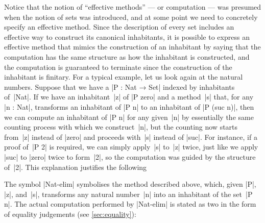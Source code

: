 Notice that the notion of ``effective methods'' --- or computation --- was presumed when the notion of sets was introduced, and at some point we need to concretely specify an effective method.
Since the description of every set includes an effective way to construct its canonical inhabitants, it is possible to express an effective method that mimics the construction of an inhabitant by saying that the computation has the same structure as how the inhabitant is constructed, and the computation is guaranteed to terminate since the construction of the inhabitant is finitary.
For a typical example, let us look again at the natural numbers.
Suppose that we have a  |P : Nat → Set| indexed by inhabitants of~|Nat|.
If we have an inhabitant~|z| of |P zero| and a method~|s| that, for any |n : Nat|, transforms an inhabitant of |P n| to an inhabitant of |P (suc n)|, then we can compute an inhabitant of |P n| for any given~|n| by essentially the same counting process with which we construct~|n|, but the counting now starts from~|z| instead of |zero| and proceeds with~|s| instead of |suc|.
For instance, if a proof of~|P 2| is required, we can simply apply~|s| to~|z| twice, just like we apply |suc| to |zero| twice to form~|2|, so the computation was guided by the structure of~|2|.
This explanation justifies the following 
\begin{center}
  
 \DP
\end{center}
The symbol |Nat-elim| symbolises the method described above, which, given |P|, |z|, and~|s|, transforms any natural number~|n| into an inhabitant of the set~|P n|.
The actual computation performed by |Nat-elim| is stated as two  in the form of equality judgements (see \autoref{sec:equality}):
\begin{center}
  
 \DP
\end{center}
